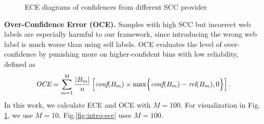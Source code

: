 \documentclass[runningheads]{llncs}
\begin{document}
\begin{figure}[t!]
    \caption{ECE diagrams of confidences from different SCC provider}
	\label{fig:ece}
\end{figure}
\textbf{Over-Confidence Error (OCE).} Samples with high SCC but incorrect web labels are especially harmful to our framework, since introducing the wrong web label is much worse than using self labels. OCE evaluates the level of over-confidence by punishing more on higher-confident bins with low reliability, defined as
\begin{equation}
\label{E:oce}
\textit{OCE} = \sum_{m=1}^{M}\frac{|B_m|}{n}\left[\textit{conf}(B_m)\times \max\Bigl\{\textit{conf}(B_m)-\textit{rel}(B_m), 0\Bigr\} \right].
\end{equation}
In this work, we calculate ECE and OCE with $M=100$. For visualization in Fig. \ref{fig:ece}, we use $M=10$. Fig.\ref{fig:intro-ece} uses $M=100$.
\end{document}
